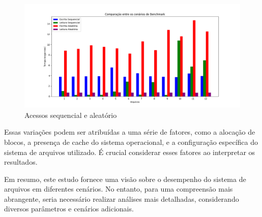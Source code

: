 \documentclass[
	12pt,				%
	openright,			%
	oneside,			%
	a4paper,			%
	chapter=TITLE,		%
	english,			%
	french,				%
	spanish,			%
	brazil				%
	]{abntex2}
\theoremstyle{definition}
\begin{document}
\begin{figure}[H]
	\centering
	\includegraphics[width=1.0\textwidth]{oneforall_grafico.png}
	\caption{Acessos sequencial e aleatório}
	\label{fig:oneforall}
\end{figure}


Essas variações podem ser atribuídas a uma série de fatores, como a 
alocação de blocos, a presença de cache do sistema operacional, e a 
configuração específica do sistema de arquivos utilizado. É crucial 
considerar esses fatores ao interpretar os resultados.

Em resumo, este estudo fornece uma visão sobre o desempenho do 
sistema de arquivos em diferentes cenários. No entanto, para uma compreensão 
mais abrangente, seria necessário realizar análises mais detalhadas, 
considerando diversos parâmetros e cenários adicionais.
\postextual



\cite{FAIRBANKS2012S118}
\cite{bovet_cesati_2005}
\cite{Tso}
\cite{matur}
\cite{kumar}
\cite{carrier2005file}
\end{document}
